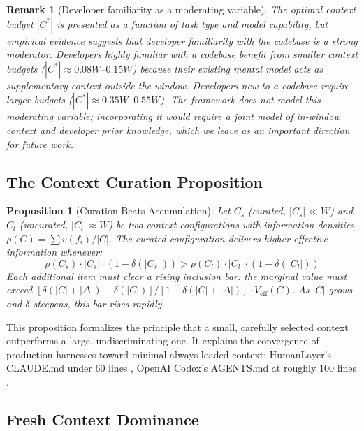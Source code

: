 \documentclass[11pt, a4paper]{googledeepmind}
\newtheorem{proposition}{Proposition}[section]
\newtheorem*{remark}{Remark}
\begin{document}
\begin{remark}[Developer familiarity as a moderating variable]
The optimal context budget $|C^*|$ is presented as a function of task type and model capability, but empirical evidence suggests that developer familiarity with the codebase is a strong moderator. Developers highly familiar with a codebase benefit from smaller context budgets ($|C^*| \approx 0.08W$--$0.15W$) because their existing mental model acts as supplementary context outside the window. Developers new to a codebase require larger budgets ($|C^*| \approx 0.35W$--$0.55W$). The framework does not model this moderating variable; incorporating it would require a joint model of in-window context and developer prior knowledge, which we leave as an important direction for future work.
\end{remark}

\subsection{The Context Curation Proposition}

\begin{proposition}[Curation Beats Accumulation]
\label{thm:curation}
Let $C_s$ (curated, $|C_s| \ll W$) and $C_l$ (uncurated, $|C_l| \approx W$) be two context configurations with information densities $\rho(C) = \sum v(f_i) / |C|$. The curated configuration delivers higher effective information whenever:
\begin{equation}
    \rho(C_s) \cdot |C_s| \cdot (1 - \delta(|C_s|)) > \rho(C_l) \cdot |C_l| \cdot (1 - \delta(|C_l|))
\end{equation}
Each additional item must clear a rising inclusion bar: the marginal value must exceed $[\delta(|C| + |\Delta|) - \delta(|C|)] / [1 - \delta(|C| + |\Delta|)] \cdot V_{\text{eff}}(C)$. As $|C|$ grows and $\delta$ steepens, this bar rises rapidly.
\end{proposition}

This proposition formalizes the principle that a small, carefully selected context outperforms a large, undiscriminating one. It explains the convergence of production harnesses toward minimal always-loaded context: HumanLayer's CLAUDE.md under 60 lines \citep{humanlayer2025skillissue}, OpenAI Codex's AGENTS.md at roughly 100 lines \citep{openai2025codex}.

\subsection{Fresh Context Dominance}
\end{document}
